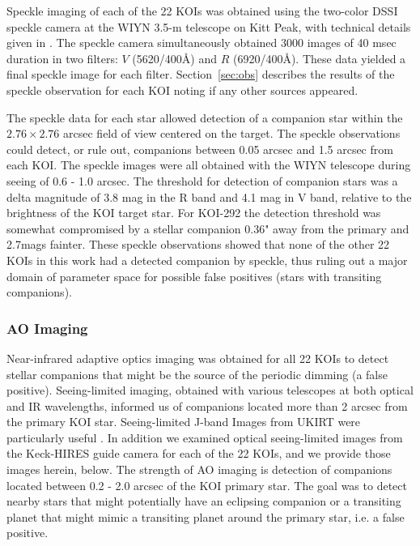 \documentclass{emulateapj}
\begin{document}
Speckle imaging of each of the 22 KOIs was obtained using the
two-color DSSI speckle camera at the WIYN 3.5-m telescope on Kitt
Peak, with technical details given in \citet{Howell2011,
  Horch2009}. The speckle camera simultaneously obtained 3000 images
of 40 msec duration in two filters: $V$ (5620/400\AA) and $R$
(6920/400\AA). These data yielded a final speckle image for each
filter. Section~\ref{sec:obs} describes the results of the speckle
observation for each KOI noting if any other sources appeared.

The speckle data for each star allowed detection of a companion star
within the $2.76 \times 2.76$ arcsec field of view centered on the
target.  The speckle observations could detect, or rule out,
companions between 0.05 arcsec and 1.5 arcsec from each KOI. The
speckle images were all obtained with the WIYN telescope during seeing
of 0.6 - 1.0 arcsec.  The threshold for detection of companion stars
was a delta magnitude of 3.8 mag in the R band and 4.1 mag in V band,
relative to the brightness of the KOI target star. For KOI-292 the
detection threshold was somewhat compromised by a stellar companion
0.36" away from the primary and 2.7mags fainter.  These speckle
observations showed that none of the other 22 KOIs in this work had a
detected companion by speckle, thus ruling out a major domain of
parameter space for possible false positives (stars with transiting
companions).

\subsubsection{AO Imaging}
\label{sec:ao}

Near-infrared adaptive optics imaging was obtained for all 22 KOIs to
detect stellar companions that might be the source of the periodic
dimming (a false positive).  Seeing-limited imaging, obtained with
various telescopes at both optical and IR wavelengths, informed us of
companions located more than 2 arcsec from the primary KOI star.
Seeing-limited J-band Images from UKIRT were particularly useful
\citep{Lawrence2007}.  In addition we examined optical seeing-limited
images from the Keck-HIRES guide camera for each of the 22 KOIs, and
we provide those images herein, below.  The strength of AO imaging is
detection of companions located between 0.2 - 2.0 arcsec of the KOI
primary star.  The goal was to detect nearby stars that might
potentially have an eclipsing companion or a transiting planet that
might mimic a transiting planet around the primary star, i.e. a false
positive.
\end{document}
